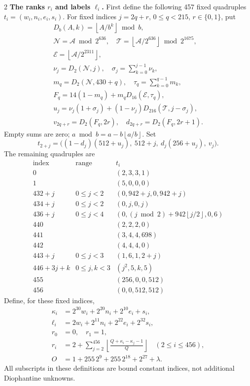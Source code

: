 \documentclass[10pt]{article}
\let\bigsum\sum
\renewcommand{\sum}{\bigsum\nolimits}
\newcommand{\fl}[1]{\left\lfloor #1\right\rfloor}
\begin{document}
\begin{multicols}{2}
\textbf{The ranks $r_i$ and labels $\ell_i$.}
First define the following 457 fixed quadruples
$t_i=(w_i,n_i,e_i,s_i)$.
For fixed indices $j=2q+r$, $0\le q<215$, $r\in\{0,1\}$, put
\[
\begin{gathered}
D_b(A,k)=\fl{A/b^k}\bmod b,\\
\mathcal N=\mathcal A\bmod2^{636},\quad
\mathcal T=\fl{\mathcal A/2^{636}}\bmod2^{1675},\\
\mathcal E=\fl{\mathcal A/2^{2311}},\\
\nu_j=D_2(\mathcal N,j),\quad \sigma_j=\sum_{k=0}^{j-1}\nu_k,\\
m_q=D_2(\mathcal N,430+q),\quad \tau_q=\sum_{k=0}^{q-1}m_k,\\
F_q=14(1-m_q)+m_qD_{16}(\mathcal E,\tau_q),\\
u_j=\nu_j(1+\sigma_j)+(1-\nu_j)D_{216}(\mathcal T,j-\sigma_j),\\
v_{2q+r}=D_2(F_q,2r),\quad d_{2q+r}=D_2(F_q,2r+1).
\end{gathered}
\]
Empty sums are zero; $a\bmod b=a-b\fl{a/b}$. Set
\[
t_{2+j}=\bigl((1-d_j)(512+u_j),\ 512+j,\ d_j(256+u_j),\ v_j\bigr).
\]
The remaining quadruples are
\[
\begin{array}{c|c|l}
\text{index}&\text{range}&t_i\\\hline
0&& (2,3,3,1)\\
1&& (5,0,0,0)\\
432+j&0\le j<2&(0,942+j,0,942+j)\\
434+j&0\le j<2&(0,j,0,j)\\
436+j&0\le j<4&(0,(j\bmod2)+942\fl{j/2},0,6)\\
440&&(2,2,2,0)\\
441&&(3,4,4,698)\\
442&&(4,4,4,0)\\
443+j&0\le j<3&(1,6,1,2+j)\\
446+3j+k&0\le j,k<3&(j^2,5,k,5)\\
455&&(256,0,0,512)\\
456&&(0,0,512,512)
\end{array}
\]
Define, for these fixed indices,
\begin{align*}
\kappa_i&=2^{30}w_i+2^{20}n_i+2^{10}e_i+s_i,\\
\ell_i&=2w_i+2^{11}n_i+2^{22}e_i+2^{32}s_i,\\
r_0&=0,\quad r_1=1,\\
r_i&=2+\sum_{j=2}^{456}\fl{\frac{Q+\kappa_i-\kappa_j-1}{Q}}
 \quad(2\le i\le456),\\
O&=1+255\,2^9+255\,2^{18}+2^{27}+\lambda.
\end{align*}
All subscripts in these definitions are bound constant indices, not
additional Diophantine unknowns.


\end{multicols}
\end{document}
